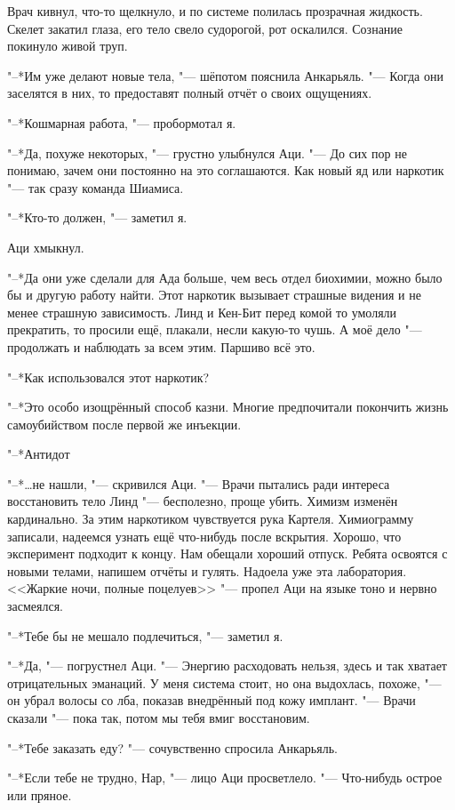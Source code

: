 Врач кивнул, что-то щелкнуло, и по системе полилась прозрачная жидкость.
Скелет закатил глаза, его тело свело судорогой, рот оскалился.
Сознание покинуло живой труп.

"--*Им уже делают новые тела, "--- шёпотом пояснила Анкарьяль.
"--- Когда они заселятся в них, то предоставят полный отчёт о своих ощущениях.

"--*Кошмарная работа, "--- пробормотал я.

"--*Да, похуже некоторых, "--- грустно улыбнулся Аци.
"--- До сих пор не понимаю, зачем они постоянно на это соглашаются.
Как новый яд или наркотик "--- так сразу команда Шиамиса.

"--*Кто-то должен, "--- заметил я.

Аци хмыкнул.

"--*Да они уже сделали для Ада больше, чем весь отдел биохимии, можно было бы и другую работу найти.
Этот наркотик вызывает страшные видения и не менее страшную зависимость.
Линд и Кен-Бит перед комой то умоляли прекратить, то просили ещё, плакали, несли какую-то чушь.
А моё дело "--- продолжать и наблюдать за всем этим.
Паршиво всё это.

"--*Как использовался этот наркотик?

"--*Это особо изощрённый способ казни.
Многие предпочитали покончить жизнь самоубийством после первой же инъекции.

"--*Антидот\ldotsq

"--*\ldots не нашли, "--- скривился Аци.
"--- Врачи пытались ради интереса восстановить тело Линд "--- бесполезно, проще убить.
Химизм изменён кардинально.
За этим наркотиком чувствуется рука Картеля.
Химиограмму записали, надеемся узнать ещё что-нибудь после вскрытия.
Хорошо, что эксперимент подходит к концу.
Нам обещали хороший отпуск.
Ребята освоятся с новыми телами, напишем отчёты и гулять.
Надоела уже эта лаборатория.
<<Жаркие ночи, полные поцелуев\ldotst>> "--- пропел Аци на языке тоно и нервно засмеялся.

"--*Тебе бы не мешало подлечиться, "--- заметил я.

"--*Да, "--- погрустнел Аци.
"--- Энергию расходовать нельзя, здесь и так хватает отрицательных эманаций.
У меня система стоит, но она выдохлась, похоже, "--- он убрал волосы со лба, показав внедрённый под кожу имплант.
"--- Врачи сказали "--- пока так, потом мы тебя вмиг восстановим.

"--*Тебе заказать еду? "--- сочувственно спросила Анкарьяль.

"--*Если тебе не трудно, Нар, "--- лицо Аци просветлело.
"--- Что-нибудь острое или пряное.


